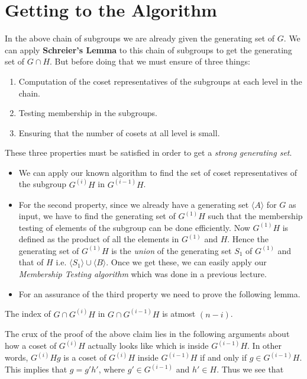 \section{Getting to the Algorithm }
In the above chain of subgroups we are already given the generating set of $G$. We can apply {\bf Schreier's Lemma} to this chain of subgroups to get the generating set of $G\cap H$. But before doing that we must ensure of three things:
\begin{enumerate}
	\item Computation of the coset representatives of the subgroups at each level in the chain.
	\item Testing membership in the subgroups.
	\item Ensuring that the number of cosets at all level is small.
\end{enumerate}
These three properties must be satisfied in order to get a \emph{strong generating set}. 
\begin{itemize}
	\item We can apply our known algorithm to find the set of coset representatives of the subgroup $G^{(i)}H$ in $G^{(i-1)}H$.
	\item For the second property, since we already have a generating set $\langle A\rangle$ for $G$ as input, we have to find the generating set of $G^{(1)}H$ such that the membership testing of elements of the subgroup can be done efficiently. Now $G^{(1)}H$ is defined as the product of all the elements in $G^{(1)}$ and $H$. Hence the generating set of $G^{(1)}H$ is the \emph{union} of the generating set $S_1$ of $G^{(1)}$ and that of $H$ i.e. $\langle S_1 \rangle\cup \langle B \rangle$. Once we get these, we can easily apply our \emph{Membership Testing algorithm} which was done in a previous lecture.
	\item For an assurance of the third property we need to prove the following lemma.
\end{itemize}
\begin{claim}\label{coset}
	The index of 
	$G\cap G^{(i)}H$ in $G\cap G^{(i-1)}H$  is atmost $(n-i)$.
\end{claim}
The crux of the proof of the above claim lies in the following arguments about how a coset of $G^{(i)}H$ actually looks like which is inside $G^{(i-1)}H$. In other words, $G^{(i)}Hg$ is a coset of $G^{(i)}H$ inside $G^{(i-1)}H$ if and only if $g\in G^{(i-1)}H$. This implies that $g = g'h'$, where $g'\in G^{(i-1)}$ and $h'\in H$. Thus we see that 
